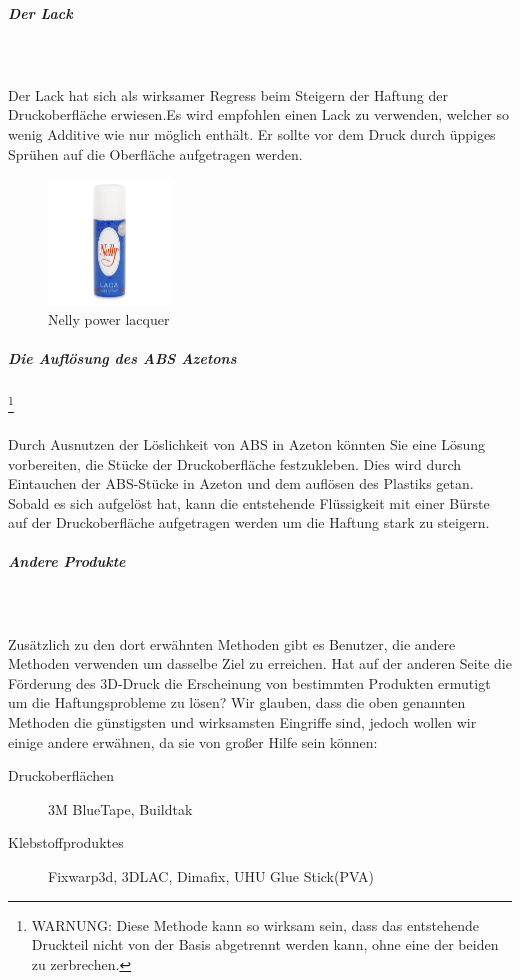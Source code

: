 \documentclass[11pt,a4paper]{article}
\begin{document}
				\subparagraph{Der Lack}\mbox{}\\\\
Der Lack hat sich als wirksamer Regress beim Steigern der Haftung der Druckoberfläche erwiesen.Es wird empfohlen einen Lack zu verwenden, welcher so wenig Additive wie nur möglich enthält. Er sollte vor dem Druck durch üppiges Sprühen auf die Oberfläche aufgetragen werden.
\begin{figure}[H]
\centering
\includegraphics[width=0.3\textwidth,cfbox=azul_marcos 4pt 0pt]{FOTOS/LACA}
\caption*{Nelly power lacquer}
\end{figure}
				\subparagraph{Die Auflösung des ABS Azetons }\footnote{WARNUNG: Diese Methode kann so wirksam sein, dass das entstehende Druckteil nicht von der Basis abgetrennt werden kann, ohne eine der beiden zu zerbrechen.} \mbox{}\\\\
Durch Ausnutzen der Löslichkeit von ABS in Azeton könnten Sie eine Lösung vorbereiten, die Stücke der Druckoberfläche festzukleben. Dies wird durch Eintauchen der ABS-Stücke in Azeton und dem auflösen des Plastiks getan. Sobald es sich aufgelöst hat, kann die entstehende Flüssigkeit mit einer Bürste auf der Druckoberfläche aufgetragen werden um die Haftung stark zu steigern.
				\subparagraph{Andere Produkte}\mbox{}\\\\
Zusätzlich zu den dort erwähnten Methoden gibt es Benutzer, die andere Methoden verwenden um dasselbe Ziel zu erreichen. Hat auf der anderen Seite die Förderung des 3D-Druck die Erscheinung von bestimmten Produkten ermutigt um die Haftungsprobleme zu lösen? Wir glauben, dass die oben genannten Methoden die günstigsten und wirksamsten Eingriffe sind, jedoch wollen wir einige andere erwähnen, da sie von großer Hilfe sein können: 
\begin{description}
\item[Druckoberflächen] 3M BlueTape, Buildtak
\item[Klebstoffproduktes] Fixwarp3d, 3DLAC, Dimafix, UHU Glue Stick(PVA)
\end{description}
\end{document}
